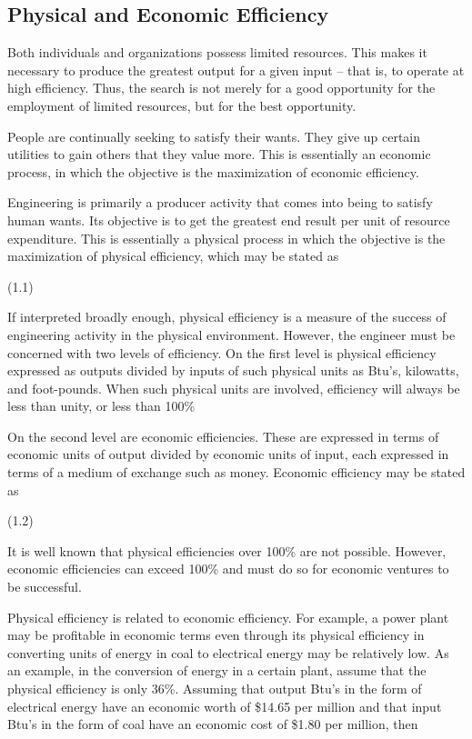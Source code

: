 \subsection{Physical and Economic Efficiency}

Both individuals and organizations possess limited resources. This makes it necessary to produce the greatest output for a given input – that is, to operate at high efficiency. Thus, the search is not merely for a good opportunity for the employment of limited resources, but for the best opportunity.

People are continually seeking to satisfy their wants. They give up certain utilities to gain others that they value more. This is essentially an economic process, in which the objective is the maximization of economic efficiency.

Engineering is primarily a producer activity that comes into being to satisfy human wants. Its objective is to get the greatest end result per unit of resource expenditure. This is essentially a physical process in which the objective is the maximization of physical efficiency, which may be stated as

				(1.1)

If interpreted broadly enough, physical efficiency is a measure of the success of engineering activity in the physical environment. However, the engineer must be concerned with two levels of efficiency. On the first level is physical efficiency expressed as outputs divided by inputs of such physical units as Btu’s, kilowatts, and foot-pounds. When such physical units are involved, efficiency will always be less than unity, or less than 100\%

On the second level are economic efficiencies. These are expressed in terms of economic units of output divided by economic units of input, each expressed in terms of a medium of exchange such as money. Economic efficiency may be stated as

				(1.2)

It is well known that physical efficiencies over 100\% are not possible. However, economic efficiencies can exceed 100\% and must do so for economic ventures to be successful.

Physical efficiency is related to economic efficiency. For example, a power plant may be profitable in economic terms even through its physical efficiency in converting units of energy in coal to electrical energy may be relatively low. As an example, in the conversion of energy in a certain plant, assume that the physical efficiency is only 36\%. Assuming that output Btu’s in the form of electrical energy have an economic worth of \$14.65 per million and that input Btu’s in the form of coal have an economic cost of \$1.80 per million, then

